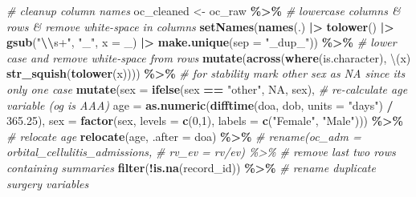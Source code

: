 \documentclass[
]{article}
\newenvironment{Shaded}{\begin{snugshade}}{\end{snugshade}}
\newcommand{\AttributeTok}[1]{\textcolor[rgb]{0.13,0.29,0.53}{#1}}
\newcommand{\CommentTok}[1]{\textcolor[rgb]{0.56,0.35,0.01}{\textit{#1}}}
\newcommand{\ConstantTok}[1]{\textcolor[rgb]{0.56,0.35,0.01}{#1}}
\newcommand{\DecValTok}[1]{\textcolor[rgb]{0.00,0.00,0.81}{#1}}
\newcommand{\FloatTok}[1]{\textcolor[rgb]{0.00,0.00,0.81}{#1}}
\newcommand{\FunctionTok}[1]{\textcolor[rgb]{0.13,0.29,0.53}{\textbf{#1}}}
\newcommand{\NormalTok}[1]{#1}
\newcommand{\OtherTok}[1]{\textcolor[rgb]{0.56,0.35,0.01}{#1}}
\newcommand{\SpecialCharTok}[1]{\textcolor[rgb]{0.81,0.36,0.00}{\textbf{#1}}}
\newcommand{\StringTok}[1]{\textcolor[rgb]{0.31,0.60,0.02}{#1}}
\begin{document}
\begin{Shaded}
\begin{Highlighting}[]
\CommentTok{\# cleanup column names}
\NormalTok{oc\_cleaned }\OtherTok{\textless{}{-}}\NormalTok{ oc\_raw }\SpecialCharTok{\%\textgreater{}\%} 
  \CommentTok{\# lowercase columns \& rows \& remove white{-}space in columns}
    \FunctionTok{setNames}\NormalTok{(}\FunctionTok{names}\NormalTok{(.) }\SpecialCharTok{|\textgreater{}} \FunctionTok{tolower}\NormalTok{() }\SpecialCharTok{|\textgreater{}} \FunctionTok{gsub}\NormalTok{(}\StringTok{"}\SpecialCharTok{\textbackslash{}\textbackslash{}}\StringTok{s+"}\NormalTok{, }\StringTok{"\_"}\NormalTok{, }\AttributeTok{x =}\NormalTok{ \_) }\SpecialCharTok{|\textgreater{}} 
               \FunctionTok{make.unique}\NormalTok{(}\AttributeTok{sep =} \StringTok{"\_dup\_"}\NormalTok{)) }\SpecialCharTok{\%\textgreater{}\%}
  \CommentTok{\# lower case and remove white{-}space from rows}
  \FunctionTok{mutate}\NormalTok{(}\FunctionTok{across}\NormalTok{(}\FunctionTok{where}\NormalTok{(is.character), \textbackslash{}(x) }\FunctionTok{str\_squish}\NormalTok{(}\FunctionTok{tolower}\NormalTok{(x)))) }\SpecialCharTok{\%\textgreater{}\%}
  \CommentTok{\# for stability mark other sex as NA since its only one case}
  \FunctionTok{mutate}\NormalTok{(}\AttributeTok{sex =} \FunctionTok{ifelse}\NormalTok{(sex }\SpecialCharTok{==} \StringTok{"other"}\NormalTok{, }\ConstantTok{NA}\NormalTok{, sex),}
         \CommentTok{\# re{-}calculate age variable (og is AAA)}
         \AttributeTok{age =} \FunctionTok{as.numeric}\NormalTok{(}\FunctionTok{difftime}\NormalTok{(doa, dob, }\AttributeTok{units =} \StringTok{"days"}\NormalTok{) }\SpecialCharTok{/} \FloatTok{365.25}\NormalTok{),}
         \AttributeTok{sex =} \FunctionTok{factor}\NormalTok{(sex, }\AttributeTok{levels =} \FunctionTok{c}\NormalTok{(}\DecValTok{0}\NormalTok{,}\DecValTok{1}\NormalTok{), }\AttributeTok{labels =} \FunctionTok{c}\NormalTok{(}\StringTok{"Female"}\NormalTok{, }\StringTok{"Male"}\NormalTok{))) }\SpecialCharTok{\%\textgreater{}\%} 
  \CommentTok{\# relocate age}
  \FunctionTok{relocate}\NormalTok{(age, }\AttributeTok{.after =}\NormalTok{ doa) }\SpecialCharTok{\%\textgreater{}\%} 
  \CommentTok{\# rename(oc\_adm = orbital\_cellulitis\_admissions,}
  \CommentTok{\#        rv\_ev = \textasciigrave{}rv/ev\textasciigrave{}) \%\textgreater{}\% }
  \CommentTok{\# remove last two rows containing summaries}
  \FunctionTok{filter}\NormalTok{(}\SpecialCharTok{!}\FunctionTok{is.na}\NormalTok{(record\_id)) }\SpecialCharTok{\%\textgreater{}\%} 
  \CommentTok{\# rename duplicate surgery variables}

\end{Highlighting}
\end{Shaded}
\end{document}
